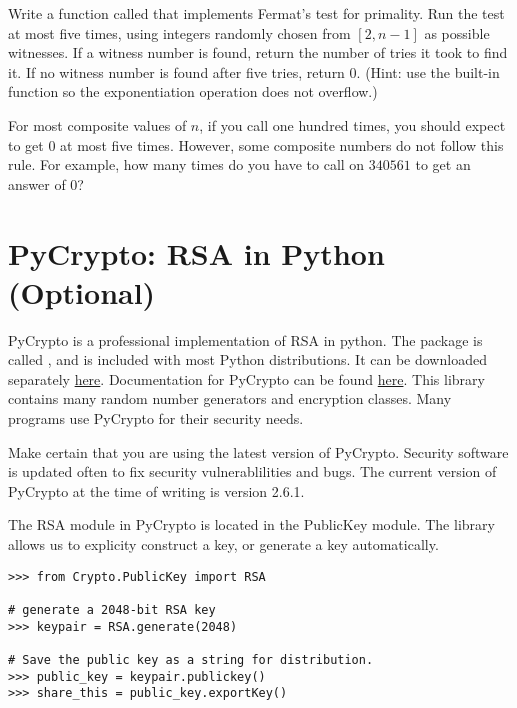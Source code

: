 \begin{problem}
Write a function called  that implements Fermat's test for primality.
Run the test at most five times, using integers randomly chosen from $[2, n-1]$ as possible witnesses.
If a witness number is found, return the number of tries it took to find it.
If no witness number is found after five tries, return $0$.
(Hint: use the built-in  function so the exponentiation operation does not overflow.)

For most composite values of $n$, if you call  one hundred times, you should expect to get $0$ at most five times.
However, some composite numbers do not follow this rule. 
For example, how many times do you have to call  on $340561$ to get an answer of $0$?
\label{prob:prime_confidence}
\end{problem}

\section*{PyCrypto: RSA in Python (Optional)}

PyCrypto is a professional implementation of RSA in python.
The package is called , and is included with most Python distributions.
It can be downloaded separately \href{https://pypi.python.org/pypi/pycrypto}{here}.
Documentation for PyCrypto can be found \href{https://www.dlitz.net/software/pycrypto/api/current/}{here}.
This library contains many random number generators and encryption classes.
Many programs use PyCrypto for their security needs.

\begin{warn}
Make certain that you are using the latest version of PyCrypto.
Security software is updated often to fix security vulnerablilities and bugs.
The current version of PyCrypto at the time of writing is version 2.6.1.
\end{warn}

The RSA module in PyCrypto is located in the PublicKey module.
The library allows us to explicity construct a key, or generate a key automatically.
\begin{lstlisting}
>>> from Crypto.PublicKey import RSA

# generate a 2048-bit RSA key
>>> keypair = RSA.generate(2048)

# Save the public key as a string for distribution.
>>> public_key = keypair.publickey()
>>> share_this = public_key.exportKey()
\end{lstlisting}

